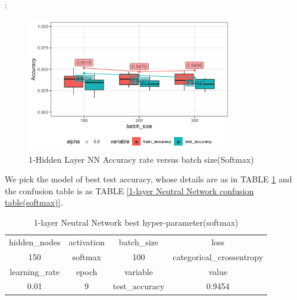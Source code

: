\documentclass[8pt]{beamer}
\begin{document}
\begin{frame}[allowframebreaks]{\secname : \subsecname}{\subsubsecname}
\begin{figure}[htbp]
\centerline{\includegraphics[width=0.8\textwidth]{figure/1-Hidden Layer Neural Network Accuracy rate versus batch_size.png}}
\caption{1-Hidden Layer NN Accuracy rate versus batch size(Softmax)}
\label{1-Hidden Layer Neural Network Accuracy rate batch size loss}
\vspace{-1.5em}
\end{figure}



We pick the model of best test accuracy, whose details are as in TABLE \ref{1-layer Neutral Network best hyper-parameter(softmax)} and the confusion table is as TABLE \ref{1-layer Neutral Network confusion table(softmax)}.
\begin{table}[htbp]
\tiny
\centering
\caption{1-layer Neutral Network best hyper-parameter(softmax)}
\begin{tabular}{|c|c|c|c|}
  \hline
 hidden\_nodes & activation & batch\_size & loss \\

 150 & softmax & 100 & categorical\_crossentropy \\
  \hline
 learning\_rate & epoch & variable & value \\ 

 0.01 &   9 & test\_accuracy & 0.9454 \\ 
   \hline
\end{tabular}
\label{1-layer Neutral Network best hyper-parameter(softmax)}	
\end{table}




\end{frame}
\end{document}

